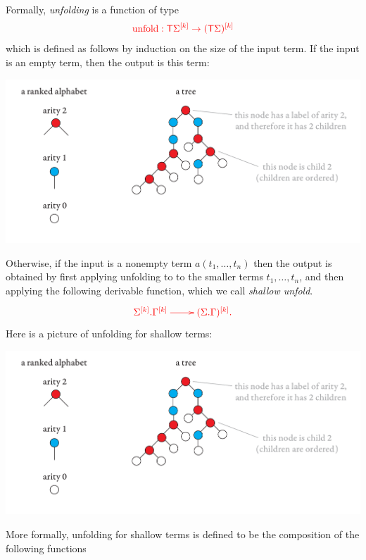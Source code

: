 Formally, \emph{unfolding} is a function of type
\begin{align*}
    \ranked{\unfold : \tmonad \mati k \rSigma \to \mati k {(\tmonad \Sigma)} }
    \end{align*}
 which is defined as follows by induction on the size of the input term. If the input is an empty term, then the output is this term:
\begin{center}
\includegraphics[scale=.3, page=83]{pics.pdf}
\end{center}
Otherwise, if the input is a nonempty term $a(t_1,\ldots,t_n)$ then the output is obtained by first applying unfolding to to the smaller terms $t_1,\ldots,t_n$, and then applying the following derivable function, which we call \emph{shallow unfold}. 
\begin{align*}
    \ranked{
        \xymatrix{
            \shallowterm{\mati k \rSigma} {\mati k \rGamma}  \ar[r] & \mati k {(\shallowterm \Sigma \Gamma)}.
        }
    }
\end{align*}
Here is a picture of unfolding for shallow terms:
\begin{center}
\includegraphics[scale=.2, page=86]{pics.pdf}
\end{center}
More formally, unfolding for shallow terms is defined to be   the composition of the following functions
